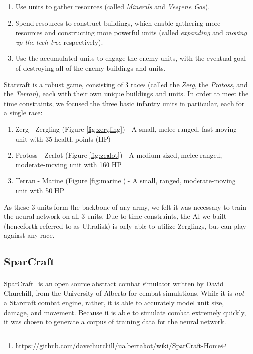 \documentclass[twocolumn]{article}
\begin{document}
\begin{enumerate}
  \item Use units to gather resources (called \textit{Minerals} and \textit{Vespene Gas}).
  \item Spend resources to construct buildings, which enable gathering more resources and constructing more powerful units (called \textit{expanding} and \textit{moving up the tech tree} respectively). 
  \item Use the accumulated units to engage the enemy units, with the eventual goal of destroying all of the enemy buildings and units. 
\end{enumerate}

Starcraft is a robust game, consisting of 3 races (called the \textit{Zerg}, the \textit{Protoss}, and the \textit{Terran}), each with their own unique buildings and units. In order to meet the time constraints, we focused the three basic infantry units in particular, each for a single race: 

\begin{enumerate}
  \item Zerg - Zergling (Figure \ref{fig:zergling}) - A small, melee-ranged, fast-moving unit with 35 health points (HP)
  \item Protoss - Zealot (Figure \ref{fig:zealot}) - A medium-sized, melee-ranged, moderate-moving unit with 160 HP
  \item Terran - Marine (Figure \ref{fig:marine}) - A small, ranged, moderate-moving unit with 50 HP
\end{enumerate}

As these 3 units form the backbone of any army, we felt it was necessary to train the neural network on all 3 units. Due to time constraints, the AI we built (henceforth referred to as Ultralisk) is only able to utilize Zerglings, but can play against any race. 

\subsection{SparCraft}

SparCraft\footnote{\tiny{\url{https://github.com/davechurchill/ualbertabot/wiki/SparCraft-Home}}} is an open source abstract combat simulator written by David Churchill, from the University of Alberta for combat simulations. While it is \textit{not} a Starcraft combat engine, rather, it is able to accurately model unit size, damage, and movement. Because it is able to simulate combat extremely quickly, it was chosen to generate a corpus of training data for the neural network. 
\end{document}
